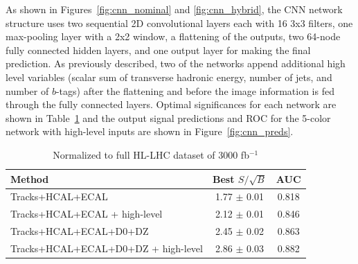 As shown in Figures~\ref{fig:cnn_nominal} and \ref{fig:cnn_hybrid}, the CNN network structure uses two sequential 2D convolutional layers each with 16 3x3 filters, one max-pooling layer with a 2x2 window, a flattening of the outputs, two 64-node fully connected hidden layers, and one output layer for making the final prediction. As previously described, two of the networks append additional high level variables (scalar sum of transverse hadronic energy, number of jets, and number of $b$-tags) after the flattening and before the image information is fed through the fully connected layers. Optimal significances for each network are shown in Table~\ref{tab:cnnResults} and the output signal predictions and ROC for the 5-color network with high-level inputs are shown in Figure~\ref{fig:cnn_preds}.

\begin{table}[h!]
\label{tab:cnnResults}
  \begin{center}
    \begin{tabular}{|l|c|c|} %
      \hline\hline
      \textbf{Method} & Best $S/\sqrt{B}$ & AUC \\
      \hline
      Tracks+HCAL+ECAL & 1.77 $\pm$ 0.01 & 0.818 \\
      Tracks+HCAL+ECAL + high-level & 2.12 $\pm$ 0.01 & 0.846 \\
      Tracks+HCAL+ECAL+D0+DZ & 2.45 $\pm$ 0.02 & 0.863 \\
      Tracks+HCAL+ECAL+D0+DZ + high-level & 2.86 $\pm$ 0.03 & 0.882 \\

      \hline\hline
    \end{tabular}
    \caption{Normalized to full HL-LHC dataset of 3000 fb$^{-1}$}
  \end{center}
\end{table}



